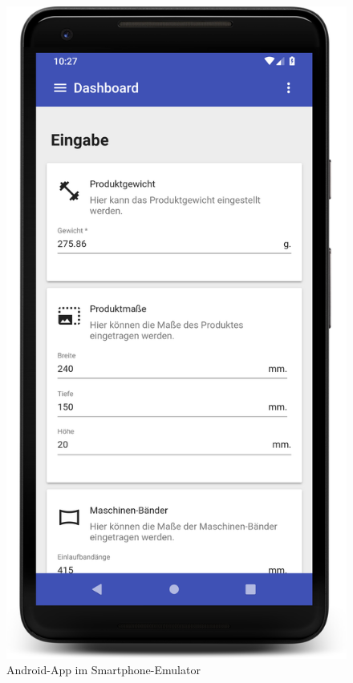 \begin{figure}[h]
    \centering
    \includegraphics[scale=0.1]{images/kapitel_4/android_app.png}
    \caption{Android-App im Smartphone-Emulator}
    \label{fig:umsetzung_android_app}
\end{figure}

